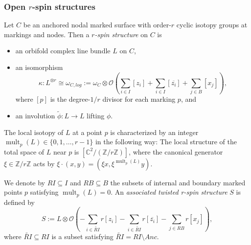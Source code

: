 \documentclass[11pt]{amsart}
\theoremstyle{definition}
\theoremstyle{remark}
\newcommand{\<}{\left<}
\renewcommand{\>}{\right>}
\numberwithin{equation}{section}
\begin{document}
\subsubsection{Open $r$-spin structures}
Let $C$ be an anchored nodal marked surface with
order-$r$ cyclic isotopy groups at markings %
and nodes. Then a %
\textit{$r$-spin structure} on $C$ is 
\begin{itemize}
    \item 
 an orbifold complex line bundle $L$ on $C$,

\item an isomorphism 
$$\kappa:L^{\otimes r} \cong \omega_{C,log}:=\omega_{C} \otimes {\mathcal{O}}\left(\sum_{i \in I}  [z_i] + \sum_{i \in I}  [\overline{z_i}] + \sum_{j \in B} [x_j]\right),$$
where $[p]$ is the degree-$1/r$ divisor for each marking %
$p$, and  

\item an %
involution $\widetilde{\phi}: L \to L$ lifting $\phi$.
\end{itemize}
The local isotopy of $L$ at a point $p$ is characterized by an integer $\operatorname{mult}_p(L)\in \{0,1,\dots,r-1\}$ in the following %
way: The local %
structure of the total space of $L$ near $p$ is $[\mathbb C^2/(\mathbb Z/r\mathbb Z)]$, where the canonical generator $\xi \in \mathbb Z/r\mathbb Z$ acts by $\xi\cdot (x,y)=(\xi x, \xi^{\operatorname{mult}_p(L)}y)$.

We denote by $RI\subseteq I$ and $RB\subseteq B$ the subsets of internal and boundary marked points $p$ satisfying $\operatorname{mult}_p(L)=0$. An \textit{associated twisted r-spin structure} $S$ is defined by
$$
S:=L\otimes \mathcal O\left( -\sum_{i \in \widetilde{RI}} r [z_i] - \sum_{i \in \widetilde{RI}} r [\overline{z_i}] - \sum_{j \in RB} r [x_j]\right),
$$
where $\widetilde{RI}\subseteq RI$ is a subset satisfying $\widetilde{RI}=RI \setminus Anc   $.
\end{document}
